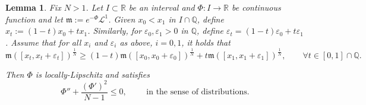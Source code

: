 \documentclass[12pt,a4paper]{amsart}
\theoremstyle{plain}
\newtheorem{lemma}{Lemma}[section]
\theoremstyle{definition}
\numberwithin{equation}{section}
\let\temp\phi
\let\phi\varphi
\let\temp\epsilon
\let\epsilon\varepsilon
\let\varepsilon\temp
\newcommand{\R}{\mathbb{R}}
\newcommand{\Q}{\mathbb{Q}}
\renewcommand{\L}{\mathcal{L}}
\newcommand{\mm}{\mathfrak m}
\begin{document}
\begin{lemma}
  \label{lem:brunn-minkowski-to-cd}
  Fix $N>1$.
  Let $I\subset \R$ be an interval and $\Phi:I\to \R$ be continuous
  function and let $\mm:=e^{-\Phi}\L^1$.
  Given $x_0 < x_1 $ in $I\cap \Q$, define $x_t:= (1-t)x_0 + t x_1$.
  Similarly, for $\epsilon_0,\epsilon_1>0$ in $\Q$, define
  $\epsilon_t=(1-t) \epsilon_0+t \epsilon_1$.
  Assume that for all $x_i$ and $\epsilon_i$ as above, $i=0,1$, it
  holds that
  \begin{equation}
    \mm([x_t,x_t+\epsilon_t])^{\frac{1}{N}}
    \geq
    (1-t)\mm([x_0,x_0+\epsilon_0])^{\frac{1}{N}}
    +
    t\mm([x_1,x_1+\epsilon_1])^{\frac{1}{N}}
    ,
    \qquad
    \forall t\in [0,1]
    \cap \Q
    .
  \end{equation}

  Then $\Phi$ is locally-Lipschitz and satisfies
  \begin{equation}
    \Phi''
    +
    \frac{(\Phi')^2}{N-1}
    \leq
    0
    ,
    \qquad
    \text{ in the sense of distributions}.
  \end{equation}
  \end{lemma}
\end{document}

